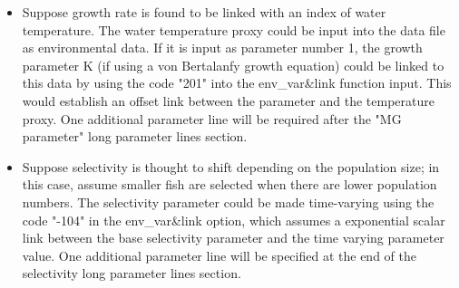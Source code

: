   \begin{itemize}
    \item Suppose growth rate is found to be linked with an index of water temperature. The water temperature proxy could be input into the data file as environmental data. If it is input as parameter number 1, the growth parameter K (if using a von Bertalanfy growth equation) could be linked to this data by using the code "201" into the env\_var\&link function input. This would establish an offset link between the parameter and the temperature proxy. One additional parameter line will be required after the "MG parameter" long parameter lines section.
    \item Suppose selectivity is thought to shift depending on the population size; in this case, assume smaller fish are selected when there are lower population numbers. The selectivity parameter could be made time-varying using the code "-104" in the env\_var\&link option, which assumes a exponential scalar link between the base selectivity parameter and the time varying parameter value. One additional parameter line will be specified at the end of the selectivity long parameter lines section.
  \end{itemize}
